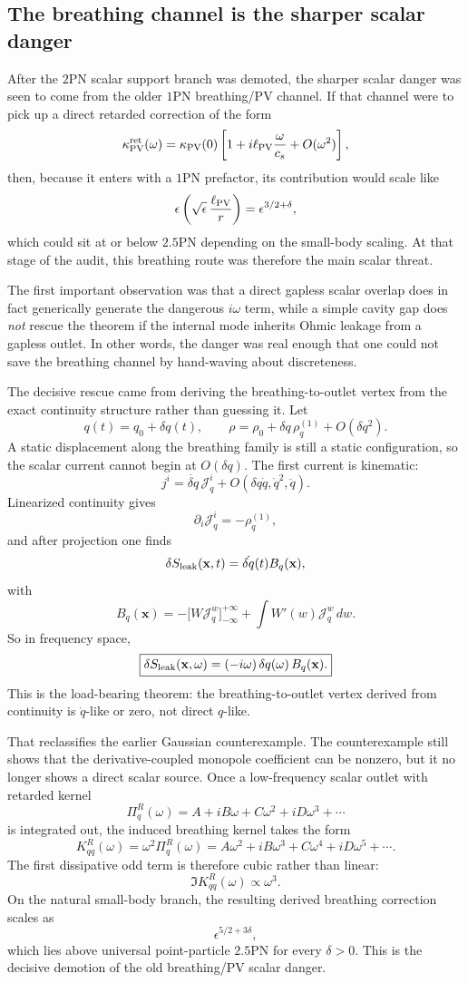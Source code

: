 \documentclass[11pt]{article}
\begin{document}
\subsection{The breathing channel is the sharper scalar danger}
\label{sec:scalar-audit-breathing}

After the $2$PN scalar support branch was demoted, the sharper scalar danger was
seen to come from the older $1$PN breathing/PV channel.  If that channel were to
pick up a direct retarded correction of the form
\[
\kappa_{\rm PV}^{\rm ret}(\omega)
=
\kappa_{\rm PV}(0)
\left[1+i\ell_{\rm PV}\frac{\omega}{c_s}+O(\omega^2)\right],
\]
then, because it enters with a $1$PN prefactor, its contribution would scale like
\[
\epsilon\left(\sqrt\epsilon\,\frac{\ell_{\rm PV}}{r}\right)
=
\epsilon^{3/2+\delta},
\]
which could sit at or below $2.5$PN depending on the small-body scaling.  At
that stage of the audit, this breathing route was therefore the main scalar
threat.

The first important observation was that a direct gapless scalar overlap does in
fact generically generate the dangerous \(i\omega\) term, while a simple cavity
gap does \emph{not} rescue the theorem if the internal mode inherits Ohmic
leakage from a gapless outlet.  In other words, the danger was real enough that
one could not save the breathing channel by hand-waving about discreteness.

The decisive rescue came from deriving the breathing-to-outlet vertex from the
exact continuity structure rather than guessing it.  Let
\[
q(t)=q_0+\delta q(t),
\qquad
\rho=\rho_0+\delta q\,\rho_q^{(1)}+O(\delta q^2).
\]
A static displacement along the breathing family is still a static
configuration, so the scalar current cannot begin at \(O(\delta q)\).  The first
current is kinematic:
\[
j^i=\dot{\delta q}\,\mathcal J_q^i+O(\delta q\dot q,\dot q^2,\ddot q).
\]
Linearized continuity gives
\[
\partial_i\mathcal J_q^i=-\rho_q^{(1)},
\]
and after projection one finds
\[
\delta S_{\rm leak}(\mathbf x,t)=\dot{\delta q}(t)B_q(\mathbf x),
\]
with
\[
B_q(\mathbf x)
=
-
\bigl[W\mathcal J_q^w\bigr]_{-\infty}^{+\infty}
+
\int W'(w)\mathcal J_q^w\,dw.
\]
So in frequency space,
\[
\boxed{
\delta S_{\rm leak}(\mathbf x,\omega)=(-i\omega)\,\delta q(\omega)\,B_q(\mathbf x).
}
\]
This is the load-bearing theorem: the breathing-to-outlet vertex derived from
continuity is \(\dot q\)-like or zero, not direct \(q\)-like.

That reclassifies the earlier Gaussian counterexample.  The counterexample still
shows that the derivative-coupled monopole coefficient can be nonzero, but it no
longer shows a direct scalar source.  Once a low-frequency scalar outlet with
retarded kernel
\[
\Pi_q^R(\omega)=A+iB\omega+C\omega^2+iD\omega^3+\cdots
\]
is integrated out, the induced breathing kernel takes the form
\[
K_{qq}^R(\omega)=\omega^2\Pi_q^R(\omega)
=
A\omega^2+iB\omega^3+C\omega^4+iD\omega^5+\cdots.
\]
The first dissipative odd term is therefore cubic rather than linear:
\[
\Im K_{qq}^R(\omega)\propto \omega^3.
\]
On the natural small-body branch, the resulting derived breathing correction
scales as
\[
\epsilon^{5/2+3\delta},
\]
which lies above universal point-particle $2.5$PN for every \(\delta>0\).  This
is the decisive demotion of the old breathing/PV scalar danger.
\end{document}
